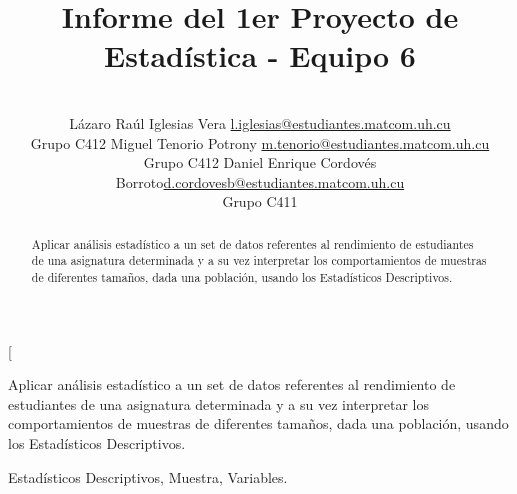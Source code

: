 \documentclass[a4paper,10pt,twocolumn]{article}
\title{Informe del 1er Proyecto de Estadística - Equipo 6}
\author{\\
\name Lázaro Raúl Iglesias Vera \email \href{mailto:l.iglesias@estudiantes.matcom.uh.cu}{l.iglesias@estudiantes.matcom.uh.cu}
\\ \addr Grupo C412 \AND
\name Miguel Tenorio Potrony \email \href{mailto:m.tenorio@estudiantes.matcom.uh.cu}{m.tenorio@estudiantes.matcom.uh.cu}
\\ \addr Grupo C412 \AND
\name Daniel Enrique Cordovés Borroto\email \href{mailto:d.cordovesb@estudiantes.matcom.uh.cu}{d.cordovesb@estudiantes.matcom.uh.cu}
\\ \addr Grupo C411}
\begin{document}
\twocolumn[

\maketitle


\begin{abstract}

	Aplicar análisis estadístico a un set de datos referentes al rendimiento de estudiantes de una asignatura determinada y a su vez interpretar los comportamientos de muestras de diferentes tamaños, dada una población, usando los Estadísticos Descriptivos.

\end{abstract}

\vspace{0.5cm}

\begin{enabstract}

  Aplicar análisis estadístico a un set de datos referentes al rendimiento de estudiantes de una asignatura determinada y a su vez interpretar los comportamientos de muestras de diferentes tamaños, dada una población, usando los Estadísticos Descriptivos.

\end{enabstract}

\begin{keywords}
	Estadísticos Descriptivos,
	Muestra,
	Variables.
\end{keywords}
\end{document}
